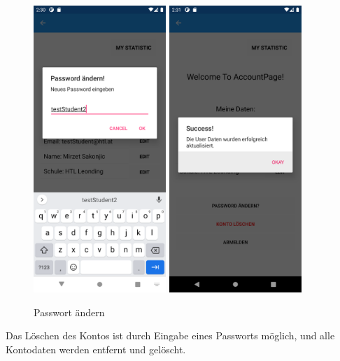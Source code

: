 \begin{figure}[h]
    \begin{center}
    \includegraphics[width=5cm]{pics/Xamarin Student/21.png}\hfill
    \includegraphics[width=5cm]{pics/Xamarin Student/22.png}
    \caption[MyAccount Passwort]{Passwort ändern}
    \end{center}
\end{figure}
\newpage
Das Löschen des Kontos ist durch Eingabe eines Passworts möglich, und alle Kontodaten werden entfernt und gelöscht.
